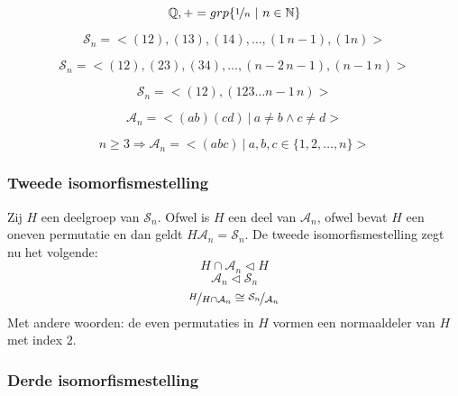 \documentclass[main.tex]{subfiles}
\begin{document}
\begin{vb}
  \[ \mathbb{Q},+ = grp\{ \nicefrac{1}{n} \ |\ n \in \mathbb{N}\} \]
\end{vb}

\begin{vb}
  \[ \mathcal{S}_n = <(12),(13),(14),\dotsc, (1\, n-1), (1n)> \]
\end{vb}

\begin{vb}
  \[ \mathcal{S}_n = <(12),(23),(34),\dotsc, (n-2\, n-1), (n-1\,n)> \]
\end{vb}

\begin{vb}
  \[ \mathcal{S}_n = <(12), (123\dotsc n-1\,n)> \]
\end{vb}

\begin{vb}
  \[ \mathcal{A}_n = <(ab)(cd)\ |\ a\neq b \wedge c \neq d> \]
\end{vb}

\begin{vb}
  \[ n \ge 3 \Rightarrow \mathcal{A}_n = <(abc)\ |\ a,b,c \in \{1,2,\dotsc,n\}> \]
\end{vb}

\subsubsection{Tweede isomorfismestelling}

\begin{vb}
  Zij $H$ een deelgroep van $\mathcal{S}_{n}$.
  Ofwel is $H$ een deel van $\mathcal{A}_{n}$, ofwel bevat $H$ een oneven permutatie en dan geldt $H\mathcal{A}_{n} = \mathcal{S}_{n}$.
  De tweede isomorfismestelling zegt nu het volgende:
  \[ H \cap \mathcal{A}_{n} \triangleleft H \]
  \[ \mathcal{A}_{n} \triangleleft \mathcal{S}_{n} \]
  \[ \nicefrac{H}{H\cap \mathcal{A}_{n}} \cong \nicefrac{\mathcal{S}_{n}}{\mathcal{A}_{n}} \]
  Met andere woorden: de even permutaties in $H$ vormen een normaaldeler van $H$ met index $2$.
\end{vb}

\subsubsection{Derde isomorfismestelling}
\label{sec:derde-isom}
\end{document}
